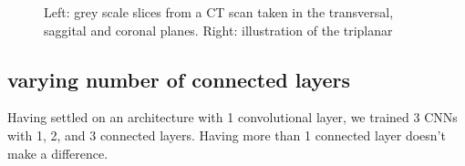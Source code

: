 \begin{figure}
\centering
\begin{minipage}{0.45\textwidth}
\centering
{}
\end{minipage}\hfill
\hspace{-1cm}
\begin{minipage}{0.45\textwidth}
\centering
{}
\end{minipage}
\caption{Left: grey scale slices from a CT scan taken in the transversal, saggital and coronal planes. Right: illustration of the triplanar}
\end{figure}

\subsection{varying number of connected layers}

Having settled on an architecture with 1 convolutional layer, we trained 3 CNNs with 1, 2, and 3 connected layers. Having more than 1 connected layer doesn't make a difference.

